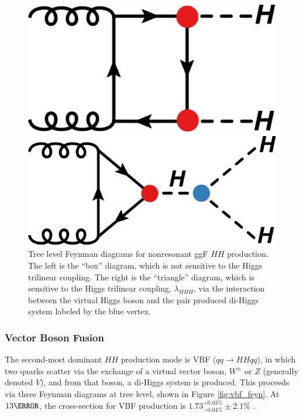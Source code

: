 \begin{figure}[!thp]
    \centering
    \begin{minipage}[c]{.40\textwidth}
        \includegraphics[width=\textwidth]{chapters/chapter1_theory/images/hh_box.pdf}
    \end{minipage}
    \hspace{0.09\textwidth}
    \begin{minipage}[c]{.40\textwidth}
        \includegraphics[width=\textwidth]{chapters/chapter1_theory/images/hh_triangle.pdf}
    \end{minipage}

    \caption[Tree level Feynman diagrams for nonresonant \gls{ggF} $HH$ production]{Tree level Feynman diagrams for nonresonant \gls{ggF} $HH$ production. The left is the ``box'' diagram, which is not sensitive to the Higgs trilinear coupling. The right is the ``triangle'' diagram, which is sensitive to the Higgs trilinear coupling, $\lambda_{HHH}$, via the interaction between the virtual Higgs boson and the pair produced di-Higgs system labeled by the blue vertex.}
    \label{fig:ggf_feyn}
\end{figure}

\subsubsection{Vector Boson Fusion} \label{sssec:vbfHH}
The second-most dominant $HH$ production mode is \gls{VBF} ($qq \rightarrow HHqq$), in which two quarks scatter via the exchange of a virtual vector boson, $W^\pm$ or $Z$ (generally denoted $V$), and from that boson, a di-Higgs system is produced. This proceeds via three Feynman diagrams at tree level, shown in Figure \ref{fig:vbf_feyn}. At $\unit{13}{\TeV}$, the cross-section for \gls{VBF} production is $1.73^{+0.03\%}_{-0.04\%} \pm 2.1\%$ \cite{hh-crosssections}.

